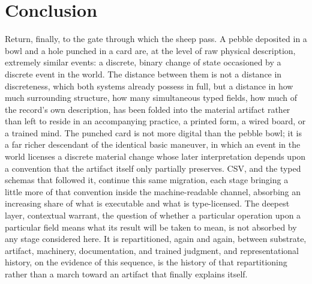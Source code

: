 \documentclass[11pt]{article}
\begin{document}
\section{Conclusion}

Return, finally, to the gate through which the sheep pass. A pebble deposited in a bowl and a hole punched in a card are, at the level of raw physical description, extremely similar events: a discrete, binary change of state occasioned by a discrete event in the world. The distance between them is not a distance in discreteness, which both systems already possess in full, but a distance in how much surrounding structure, how many simultaneous typed fields, how much of the record's own description, has been folded into the material artifact rather than left to reside in an accompanying practice, a printed form, a wired board, or a trained mind. The punched card is not more digital than the pebble bowl; it is a far richer descendant of the identical basic maneuver, in which an event in the world licenses a discrete material change whose later interpretation depends upon a convention that the artifact itself only partially preserves. CSV, and the typed schemas that followed it, continue this same migration, each stage bringing a little more of that convention inside the machine-readable channel, absorbing an increasing share of what is executable and what is type-licensed. The deepest layer, contextual warrant, the question of whether a particular operation upon a particular field means what its result will be taken to mean, is not absorbed by any stage considered here. It is repartitioned, again and again, between substrate, artifact, machinery, documentation, and trained judgment, and representational history, on the evidence of this sequence, is the history of that repartitioning rather than a march toward an artifact that finally explains itself.
\end{document}
